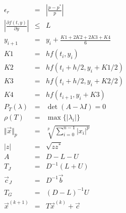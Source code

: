 \documentclass[12pt]{article}
\begin{document}
  \begin{eqnarray*}
  \epsilon_r & = & \left\vert \frac{p - p^*}{p} \right\vert \\
  \left\vert \frac{\partial f(t, y)}{\partial y} \right\vert & \leq & L \\
  y_{i+1} & = & y_i + \frac{K1 + 2K2 + 2K3 + K4}{6} \\
  K1 & = & hf(t_i, y_i) \\
  K2 & = & hf(t_i + h/2, y_i + K1/2) \\
  K3 & = & hf(t_i + h/2, y_i + K2/2) \\
  K4 & = & hf(t_{i+1}, y_i + K3)\\
%
%
  P_{T}(\lambda) & = & \det(A-\lambda I) = 0 \\
  \rho(T) & = & \max \lbrace \vert \lambda_i \vert \rbrace \\
  \Vert \vec{x} \Vert_{p} & = & \sqrt[p]{\sum_{i=0}^{n-1} \vert x_i \vert^p} \\
  \left\vert z \right\vert & = & \sqrt{zz^*} \\
  A & = & D - L - U \\
  T_J & = & D^{-1}(L+U) \\
  \vec{c}_J & = & D^{-1}\vec{b} \\
  T_G & = & {(D-L)}^{-1}U \\
  \vec{x}^{(k+1)} & = & T\vec{x}^{(k)} + \vec{c}
  \end{eqnarray*}
\end{document}
